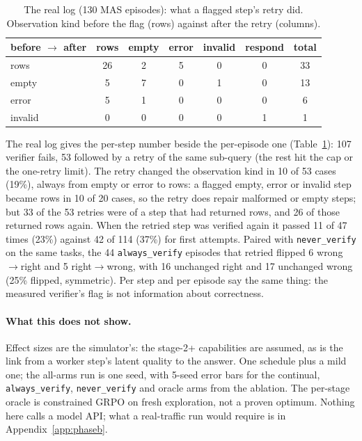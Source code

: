 \documentclass[10pt]{article}
\newcommand{\code}[1]{\texttt{#1}}
\begin{document}
\begin{table}[htbp]
\centering\small
\caption{The real log (130 MAS episodes): what a flagged step's retry did. Observation kind before the flag (rows) against after the retry (columns).}
\label{tab:retry}
\begin{tabular}{lcccccc}
\toprule
before $\to$ after & rows & empty & error & invalid & respond & total \\
\midrule
rows & 26 & 2 & 5 & 0 & 0 & 33 \\
empty & 5 & 7 & 0 & 1 & 0 & 13 \\
error & 5 & 1 & 0 & 0 & 0 & 6 \\
invalid & 0 & 0 & 0 & 0 & 1 & 1 \\
\bottomrule
\end{tabular}
\end{table}

The real log gives the per-step number beside the per-episode one (Table~\ref{tab:retry}): 107 verifier fails, 53 followed by a retry of the same sub-query (the rest hit the cap or the one-retry limit). The retry changed the observation kind in 10 of 53 cases (19\%), always from empty or error to rows: a flagged empty, error or invalid step became rows in 10 of 20 cases, so the retry does repair malformed or empty steps; but 33 of the 53 retries were of a step that had returned rows, and 26 of those returned rows again. When the retried step was verified again it passed 11 of 47 times (23\%) against 42 of 114 (37\%) for first attempts. Paired with \code{never\_verify} on the same tasks, the 44 \code{always\_verify} episodes that retried flipped 6 wrong$\to$right and 5 right$\to$wrong, with 16 unchanged right and 17 unchanged wrong (25\% flipped, symmetric). Per step and per episode say the same thing: the measured verifier's flag is not information about correctness.

\paragraph{What this does not show.} Effect sizes are the simulator's: the stage-2+ capabilities are assumed, as is the link from a worker step's latent quality to the answer. One schedule plus a mild one; the all-arms run is one seed, with 5-seed error bars for the continual, \code{always\_verify}, \code{never\_verify} and oracle arms from the ablation. The per-stage oracle is constrained GRPO on fresh exploration, not a proven optimum. Nothing here calls a model API; what a real-traffic run would require is in Appendix~\ref{app:phaseb}.
\end{document}
